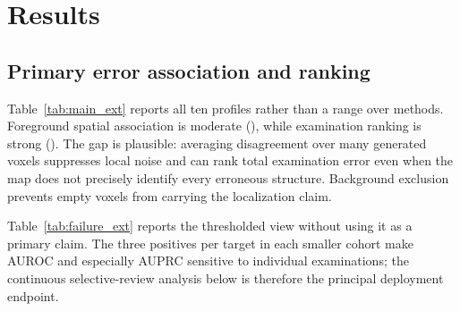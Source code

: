 \documentclass{article}
\begin{document}
\section{Results}

\subsection{Primary error association and ranking}
\begin{table}[t]
 \centering
 \caption{Pre-specified all-member median disagreement. Pixel $r_z$ is the inverse Fisher-$z$ mean of per-examination foreground correlations. Lower nAURC is better. MAE$_{50}$ is an absolute retained risk and is not compared across cohort intensity scales.}
 \resizebox{\textwidth}{!}{}
 \label{tab:main_ext}
\end{table}

Table~\ref{tab:main_ext} reports all ten profiles rather than a range over methods. Foreground spatial association is moderate (\PixelFisherRange), while examination ranking is strong (\CaseSpearmanRange). The gap is plausible: averaging disagreement over many generated voxels suppresses local noise and can rank total examination error even when the map does not precisely identify every erroneous structure. Background exclusion prevents empty voxels from carrying the localization claim.

\begin{table}[t]
 \centering
 \caption{Secondary highest-MAE-decile failure detection. Small positive counts make these thresholded endpoints less stable than risk--coverage and examination ranking.}
 \resizebox{0.82\textwidth}{!}{}
 \label{tab:failure_ext}
\end{table}

Table~\ref{tab:failure_ext} reports the thresholded view without using it as a primary claim. The three positives per target in each smaller cohort make AUROC and especially AUPRC sensitive to individual examinations; the continuous selective-review analysis below is therefore the principal deployment endpoint.

\begin{table}[t]
 \centering
 \caption{Foreground versus all-generated-voxel spatial association, averaged over fixed target profiles. The all-pixel result is secondary because background can dominate.}
 \resizebox{\columnwidth}{!}{}
 \label{tab:pixel_support_ext}
\end{table}
\end{document}
